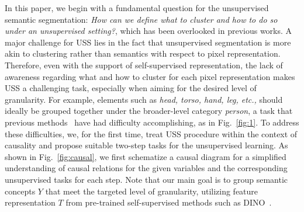 \documentclass{article} \usepackage{iclr2024_conference,times}
\begin{document}
In this paper, we begin with a fundamental question for the unsupervised semantic segmentation: \textit{How can we define what to cluster and how to do so under an unsupervised setting?}, which has been overlooked in previous works. A major challenge for USS lies in the fact that unsupervised segmentation is more akin to clustering rather than semantics with respect to pixel representation. Therefore, even with the support of self-supervised representation, the lack of awareness regarding what and how to cluster for each pixel representation makes USS a challenging task, especially when aiming for the desired level of granularity. For example, elements such as \textit{head, torso, hand, leg, etc.,} should ideally be grouped together under the broader-level category \textit{person}, a task that previous methods~\citep{hamilton2022unsupervised, seong2023leveraging} have had difficulty accomplishing, as in Fig.~\ref{fig:1}. To address these difficulties, we, for the first time, treat USS procedure within the context of causality and propose suitable two-step tasks for the unsupervised learning. As shown in Fig.~\ref{fig:causal}, we first schematize a causal diagram for a simplified understanding of causal relations for the given variables and the corresponding unsupervised tasks for each step. Note that our main goal is to group semantic concepts $Y$ that meet the targeted level of granularity, utilizing feature representation $T$ from pre-trained self-supervised methods such as DINO~\citep{caron2021emerging}.


\end{document}
